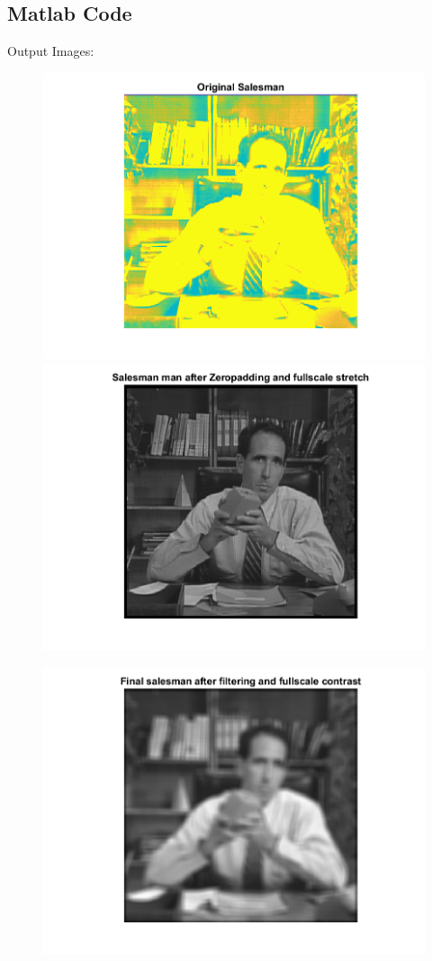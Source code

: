 \documentclass[11pt]{article} %
\begin{document}
\subsection*{Matlab Code}

Output Images:
\begin{figure}
 \centering
	\includegraphics{1aa.png}
	\includegraphics{1ab.png}
\end{figure}
\begin{figure}
\centering
	\includegraphics{1ac.png}
\end{figure}
\clearpage
\end{document}

